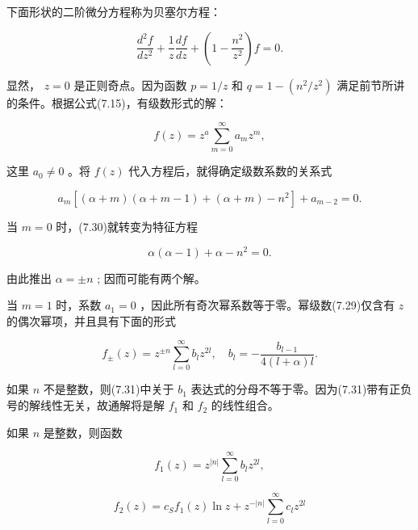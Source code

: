 下面形状的二阶微分方程称为贝塞尔方程：

\begin{equation*}
\frac {d ^ {2} f}{d z ^ {2}} + \frac {1}{z} \frac {d f}{d z} + \left(1 - \frac {n ^ {2}}{z ^ {2}}\right) f = 0.\tag{7.29}
\end{equation*}

显然， $z = 0$ 是正则奇点。因为函数 $p = 1 / z$ 和 $q = 1 - (n^2 / z^2)$ 满足前节所讲的条件。根据公式(7.15)，有级数形式的解：

\begin{equation*}
f (z) = z ^ {a} \sum_ {m = 0} ^ {\infty} a _ {m} z ^ {m},\tag{7.29a}
\end{equation*}

这里 $a_0 \neq 0$ 。将 $f(z)$ 代入方程后，就得确定级数系数的关系式

\begin{equation*}
a _ {m} [ (\alpha + m) (\alpha + m - 1) + (\alpha + m) - n ^ {2} ] + a _ {m - 2} = 0.\tag{7.30}
\end{equation*}

当 $m = 0$ 时，(7.30)就转变为特征方程

\begin{equation*}
\alpha (\alpha - 1) + \alpha - n ^ {2} = 0.
\end{equation*}

由此推出 $\alpha = \pm n$ ; 因而可能有两个解。

当 $m = 1$ 时，系数 $a_1 = 0$ ，因此所有奇次幂系数等于零。幂级数(7.29)仅含有 $z$ 的偶次幂项，并且具有下面的形式

\begin{equation*}
f _ {\pm} (z) = z ^ {\pm n} \sum_ {l = 0} ^ {\infty} b _ {l} z ^ {2 l}, \quad b _ {l} = - \frac {b _ {l - 1}}{4 (l + \alpha) l}.\tag{7.31}
\end{equation*}

如果 $n$ 不是整数，则(7.31)中关于 $b_{1}$ 表达式的分母不等于零。因为(7.31)带有正负号的解线性无关，故通解将是解 $f_{1}$ 和 $f_{2}$ 的线性组合。

如果 $n$ 是整数，则函数

\begin{equation*}
f _ {1} (z) = z ^ {| n |} \sum_ {l = 0} ^ {\infty} b _ {l} z ^ {2 l},\tag{7.32}
\end{equation*}

\begin{equation*}
f _ {2} (z) = c _ {S} f _ {1} (z) \ln z + z ^ {- | n |} \sum_ {l = 0} ^ {\infty} c _ {l} z ^ {2 l}\tag{7.33}
\end{equation*}

